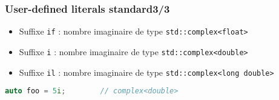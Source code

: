 \documentclass[C++.tex]{subfiles}
\begin{document}
\begin{frame}[fragile]
	\frametitle{User-defined literals standard\titlehfill{}3/3}
	\begin{itemize}
		\item Suffixe \lstinline[keywordstyle=\color{black}]|if| : nombre imaginaire de type \lstinline|std::complex<float>|
		\item Suffixe \lstinline|i| : nombre imaginaire de type \lstinline|std::complex<double>|
		\item Suffixe \lstinline|il| : nombre imaginaire de type \lstinline|std::complex<long double>|
	\end{itemize}

	\begin{lstlisting}[language=C++]
auto foo = 5i;        // complex<double>\end{lstlisting}
\end{frame}
\end{document}
